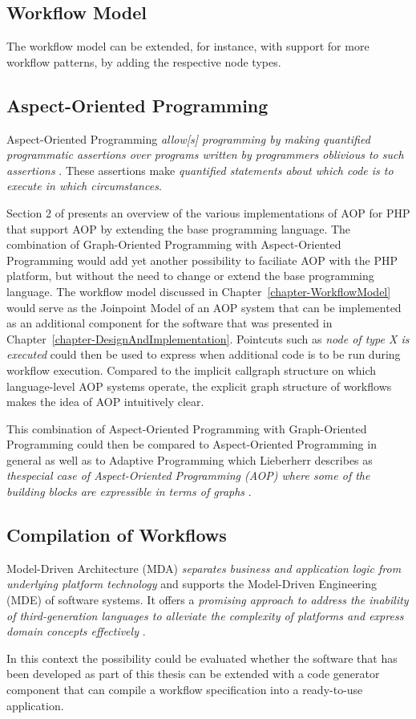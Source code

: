 \subsection{Workflow Model}

The workflow model can be extended, for instance, with support for more
workflow patterns, by adding the respective node types.

\subsection{Aspect-Oriented Programming}

Aspect-Oriented Programming \emph{allow[s] programming by making quantified
programmatic assertions over programs written by programmers oblivious to
such assertions} \cite{RF00}. These assertions make \emph{quantified
statements about which code is to execute in which circumstances}.

Section 2 of \cite{SB06} presents an overview of the various implementations
of AOP for PHP that support AOP by extending the base programming language.
The combination of Graph-Oriented Programming with Aspect-Oriented Programming
would add yet another possibility to faciliate AOP with the PHP platform, but
without the need to change or extend the base programming language. The
workflow model discussed in Chapter~\ref{chapter-WorkflowModel} would serve as
the Joinpoint Model of an AOP system that can be implemented as an additional
component for the software that was presented in
Chapter~\ref{chapter-DesignAndImplementation}. Pointcuts such as \emph{node of
type X is executed} could then be used to express when additional code is to
be run during workflow execution. Compared to the implicit callgraph structure
on which language-level AOP systems operate, the explicit graph structure of
workflows makes the idea of AOP intuitively clear.

This combination of Aspect-Oriented Programming with Graph-Oriented Programming
could then be compared to Aspect-Oriented Programming in general as well as
to Adaptive Programming which Lieberherr describes as \emph{thespecial case of
Aspect-Oriented Programming (AOP) where some of the building blocks are
expressible in terms of graphs} \cite{KL97}.

\subsection{Compilation of Workflows}

Model-Driven Architecture (MDA) \emph{separates business and application logic
from underlying platform technology} \cite{JM01} and supports the Model-Driven
Engineering (MDE) of software systems. It offers a \emph{promising approach to
address the inability of third-generation languages to alleviate the complexity
of platforms and express domain concepts effectively} \cite{DS06}.

In this context the possibility could be evaluated whether the software that
has been developed as part of this thesis can be extended with a code
generator component that can compile a workflow specification into a
ready-to-use application.
